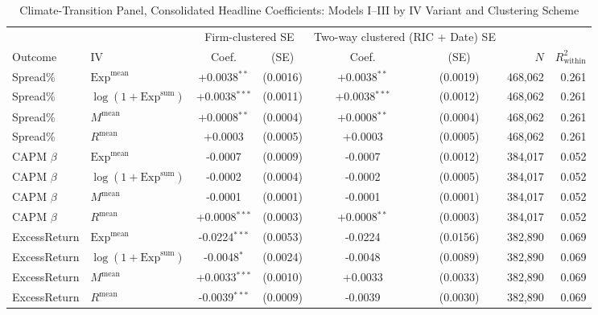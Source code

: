\begin{table}[htbp]
\centering
\caption{Climate-Transition Panel, Consolidated Headline Coefficients: Models I--III by IV Variant and Clustering Scheme}
\label{tab:v2_core}
\begin{threeparttable}
\begin{tabular}{l l c c c c r r}
\toprule
 & & \multicolumn{2}{c}{Firm-clustered SE} & \multicolumn{2}{c}{Two-way clustered (RIC + Date) SE} & & \\
\cmidrule(lr){3-4}\cmidrule(lr){5-6}
Outcome & IV & Coef. & (SE) & Coef. & (SE) & $N$ & $R^2_{\text{within}}$ \\
\midrule
Spread\% & $\mathrm{Exp}^{\text{mean}}$ & +0.0038$^{**}$ & (0.0016) & +0.0038$^{**}$ & (0.0019) & 468,062 & 0.261 \\
Spread\% & $\log(1+\mathrm{Exp}^{\text{sum}})$ & +0.0038$^{***}$ & (0.0011) & +0.0038$^{***}$ & (0.0012) & 468,062 & 0.261 \\
Spread\% & $M^{\text{mean}}$ & +0.0008$^{**}$ & (0.0004) & +0.0008$^{**}$ & (0.0004) & 468,062 & 0.261 \\
Spread\% & $R^{\text{mean}}$ & +0.0003 & (0.0005) & +0.0003 & (0.0005) & 468,062 & 0.261 \\
\addlinespace
CAPM $\beta$ & $\mathrm{Exp}^{\text{mean}}$ & -0.0007 & (0.0009) & -0.0007 & (0.0012) & 384,017 & 0.052 \\
CAPM $\beta$ & $\log(1+\mathrm{Exp}^{\text{sum}})$ & -0.0002 & (0.0004) & -0.0002 & (0.0005) & 384,017 & 0.052 \\
CAPM $\beta$ & $M^{\text{mean}}$ & -0.0001 & (0.0001) & -0.0001 & (0.0001) & 384,017 & 0.052 \\
CAPM $\beta$ & $R^{\text{mean}}$ & +0.0008$^{***}$ & (0.0003) & +0.0008$^{**}$ & (0.0003) & 384,017 & 0.052 \\
\addlinespace
ExcessReturn & $\mathrm{Exp}^{\text{mean}}$ & -0.0224$^{***}$ & (0.0053) & -0.0224 & (0.0156) & 382,890 & 0.069 \\
ExcessReturn & $\log(1+\mathrm{Exp}^{\text{sum}})$ & -0.0048$^{*}$ & (0.0024) & -0.0048 & (0.0089) & 382,890 & 0.069 \\
ExcessReturn & $M^{\text{mean}}$ & +0.0033$^{***}$ & (0.0010) & +0.0033 & (0.0033) & 382,890 & 0.069 \\
ExcessReturn & $R^{\text{mean}}$ & -0.0039$^{***}$ & (0.0009) & -0.0039 & (0.0030) & 382,890 & 0.069 \\
\bottomrule
\end{tabular}
\begin{tablenotes}\small

\end{tablenotes}
\end{threeparttable}
\end{table}
